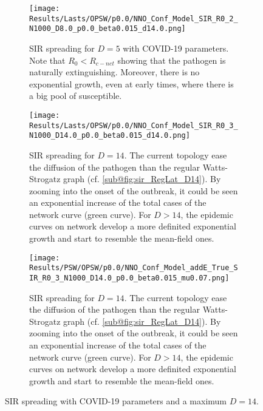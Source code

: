 \documentclass[a4paper,10pt,twoside]{book} %
\theoremstyle{definition}
\begin{document}
\begin{figure}[p]
	\centering
    \begin{subfigure}[t]{\linewidth}
        \texttt{[image: Results/Lasts/OPSW/p0.0/NNO\_Conf\_Model\_SIR\_R0\_2\_N1000\_D8.0\_p0.0\_beta0.015\_d14.0.png]}
		\centering
        \caption{SIR spreading for $D = 5$ with COVID-19 parameters. Note that $R_0 < R_{c-net}$ showing that the pathogen is naturally extinguishing. Moreover, there is no exponential growth, even at early times, where there is a big pool of susceptible.}
        \label{fig:sir_O-PSW_D5_p0}
    \end{subfigure}
	\vfill
	\begin{subfigure}[b]{\linewidth}
		\centering
        \texttt{[image: Results/Lasts/OPSW/p0.0/NNO\_Conf\_Model\_SIR\_R0\_3\_N1000\_D14.0\_p0.0\_beta0.015\_d14.0.png]}
        \caption{SIR spreading for $D = 14$. The current topology ease the diffusion of the pathogen than the regular Watts-Strogatz graph (cf. \autoref{sub@fig:sir_RegLat_D14}). By zooming into the onset of the outbreak, it could be seen an exponential increase of the total cases of the network curve (green curve). For $D > 14$, the epidemic curves on network develop a more definited exponential growth and start to resemble the mean-field ones.}
        \label{fig:sir_O-PSW_D11_p0}
    \end{subfigure}
	\begin{subfigure}[b]{\linewidth}
		\centering
        \texttt{[image: Results/PSW/OPSW/p0.0/NNO\_Conf\_Model\_addE\_True\_SIR\_R0\_3\_N1000\_D14.0\_p0.0\_beta0.015\_mu0.07.png]}
        \caption{SIR spreading for $D = 14$. The current topology ease the diffusion of the pathogen than the regular Watts-Strogatz graph (cf. \autoref{sub@fig:sir_RegLat_D14}). By zooming into the onset of the outbreak, it could be seen an exponential increase of the total cases of the network curve (green curve). For $D > 14$, the epidemic curves on network develop a more definited exponential growth and start to resemble the mean-field ones.}
        \label{fig:sir_O-PSW_D14_p0}
    \end{subfigure}
	\caption{SIR spreading with COVID-19 parameters and a maximum $D = 14$.}
	\label{fig:sir_O-PSW_COVID}
\end{figure}
\end{document}
